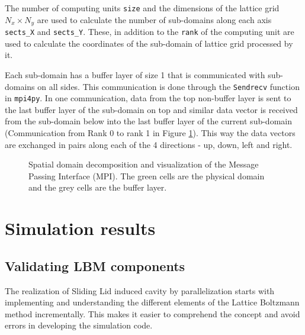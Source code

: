 \documentclass[a4paper,11pt]{report}
\begin{document}
The number of computing units \texttt{size} and the dimensions of the lattice grid $N_x \times N_y$ are used to calculate the number of sub-domains along each axis \texttt{sects\_X} and \texttt{sects\_Y}. These, in addition to the \texttt{rank} of the computing unit are used to calculate the coordinates of the sub-domain of lattice grid processed by it. 

Each sub-domain has a buffer layer of size 1 that is communicated with sub-domains on all sides. This communication is done through the \texttt{Sendrecv} function in \texttt{mpi4py}. In one communication, data from the top non-buffer layer is sent to the last buffer layer of the sub-domain on top and similar data vector is received from the sub-domain below into the last buffer layer of the current sub-domain (Communication from Rank 0 to rank 1 in Figure \ref{fig:mpi-communication}). This way the data vectors are exchanged in pairs along each of the 4 directions - up, down, left and right. 

\begin{figure}[h]
  \begin{center}
   \caption{Spatial domain decomposition and visualization of the Message Passing Interface (MPI). The green cells are the physical domain and the grey cells are the buffer layer. \cite{Pastewka2019HPCWP}}
  \label{fig:mpi-communication}
  \end{center}
\end{figure} 


\chapter{Simulation results}


\section{Validating LBM components}
The realization of Sliding Lid induced cavity by parallelization starts with implementing and understanding the different elements of the Lattice Boltzmann method incrementally. This makes it easier to comprehend the concept and avoid errors in developing the simulation code.
\end{document}
